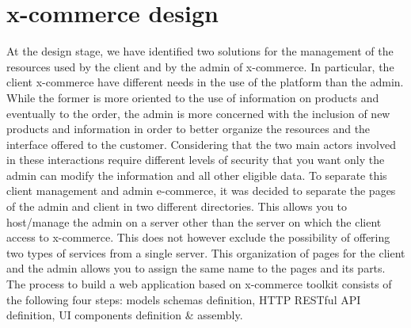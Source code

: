 \section{x-commerce design}
\label{sec:document_driven_web_development_process}
At the design stage, we have identified two solutions for the management of the resources used by the client and by the admin of x-commerce. In particular, the client x-commerce have different needs in the use of the platform than the admin. While the former is more oriented to the use of information on products and eventually to the order, the admin is more concerned with the inclusion of new products and information in order to better organize the resources and the interface offered to the customer. Considering that the two main actors involved in these interactions require different levels of security that you want only the admin can modify the information and all other eligible data.
\newline
To separate this client management and admin e-commerce, it was decided to separate the pages of the admin and client in two different directories. This allows you to host/manage the admin on a server other than the server on which the client access to x-commerce. This does not however exclude the possibility of offering two types of services from a single server.
\newline
This organization of pages for the client and the admin allows you to assign the same name to the pages and its parts.
\newline
The process to build a web application based on x-commerce toolkit consists of the following four steps: models schemas definition, HTTP RESTful API definition, UI components definition \& assembly.
